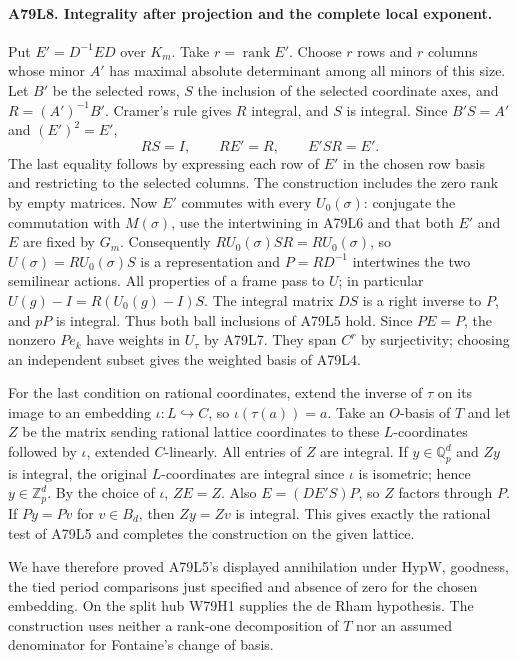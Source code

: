 \paragraph{A79L8. Integrality after projection and the complete local exponent.}
Put $E'=D^{-1}ED$ over $K_m$. Take $r=\operatorname{rank} E'$.
Choose $r$ rows and $r$ columns whose minor $A'$ has maximal
absolute determinant among all minors of this size. Let $B'$ be
the selected rows, $S$ the inclusion of the selected coordinate
axes, and $R=(A')^{-1}B'$. Cramer's rule gives $R$ integral,
and $S$ is integral. Since $B'S=A'$ and $(E')^2=E'$,
\[
 RS=I,\qquad RE'=R,\qquad E'SR=E'.
\]
The last equality follows by expressing each row of $E'$ in the
chosen row basis and restricting to the selected columns.
The construction includes the zero rank by empty matrices.
Now $E'$ commutes with every $U_0(\sigma)$:
conjugate the commutation with $M(\sigma)$, use the intertwining
in A79L6 and that both $E'$ and $E$ are fixed by $G_m$.
Consequently $R U_0(\sigma) S R=R U_0(\sigma)$, so
$U(\sigma)=R U_0(\sigma)S$ is a representation and
$P=RD^{-1}$ intertwines the two semilinear actions.
All properties of a frame pass to $U$; in particular
$U(g)-I=R(U_0(g)-I)S$. The integral matrix $DS$ is a right
inverse to $P$, and $pP$ is integral. Thus both ball inclusions
of A79L5 hold. Since $P E=P$, the nonzero $P e_k$ have weights
in $U_\tau$ by A79L7. They span $C^r$ by surjectivity; choosing
an independent subset gives the weighted basis of A79L4.

For the last condition on rational coordinates, extend the inverse
of $\tau$ on its image to an embedding $\iota:L\hookrightarrow C$,
so $\iota(\tau(a))=a$. Take an $O$-basis of $T$ and let $Z$ be the
matrix sending rational lattice coordinates to these $L$-coordinates
followed by $\iota$, extended $C$-linearly. All entries of $Z$ are
integral. If $y\in\mathbb Q_p^d$ and $Zy$ is integral, the original
$L$-coordinates are integral since $\iota$ is isometric; hence
$y\in\mathbb Z_p^d$. By the choice of $\iota$, $ZE=Z$.
Also $E=(DE'S)P$, so $Z$ factors through $P$.
If $Py=Pv$ for $v\in B_d$, then $Zy=Zv$ is integral.
This gives exactly the rational test of A79L5 and completes the
construction on the given lattice.

We have therefore proved A79L5's displayed annihilation under
$\mathrm{HypW}$, goodness, the tied period comparisons just specified
and absence of zero for the chosen embedding. On the split hub
W79H1 supplies the de Rham hypothesis. The construction uses neither
a rank-one decomposition of $T$ nor an assumed denominator for
Fontaine's change of basis.
